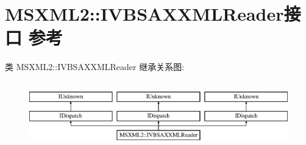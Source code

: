 \hypertarget{interface_m_s_x_m_l2_1_1_i_v_b_s_a_x_x_m_l_reader}{}\section{M\+S\+X\+M\+L2\+:\+:I\+V\+B\+S\+A\+X\+X\+M\+L\+Reader接口 参考}
\label{interface_m_s_x_m_l2_1_1_i_v_b_s_a_x_x_m_l_reader}
类 M\+S\+X\+M\+L2\+:\+:I\+V\+B\+S\+A\+X\+X\+M\+L\+Reader 继承关系图\+:\begin{figure}[H]
\begin{center}
\leavevmode
\includegraphics[height=2.901554cm]{interface_m_s_x_m_l2_1_1_i_v_b_s_a_x_x_m_l_reader}
\end{center}
\end{figure}
